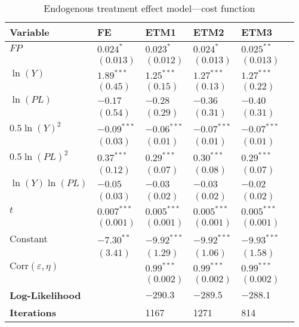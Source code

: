 \begin{table}[ht]
\centering
\caption{Endogenous treatment effect model—cost function}
\label{tab:results}
\begin{tabular}{llllll}
\toprule
\textbf{Variable} & \textbf{FE} & \textbf{ETM1} & \textbf{ETM2} & \textbf{ETM3}\\
\midrule
$FP$ & $0.024^{*}$ & $0.023^{*}$&  $0.024^{*}$ & $0.025^{**}$ \\
          & $(0.013)$ & $(0.012)$ & $(0.013)$ & $(0.013)$ \\[6pt]
$\ln(Y)$ & $1.89^{***}$ & $1.25^{***}$ & $1.27^{***}$ & $1.27^{***}$ \\
           & $(0.45)$ & $(0.15)$ & $(0.13)$ & $(0.22)$ \\[6pt]
$\ln(PL)$ & $-0.17$ & $-0.28$ & $-0.36$ & $-0.40$ \\
           & $(0.54)$ & $(0.29)$ & $(0.31)$& $(0.31)$ \\[6pt]
$0.5 \ln(Y)^2$ & $-0.09^{***}$ & $-0.06^{***}$ & $-0.07^{***}$ & $-0.07^{***}$ \\
           & $(0.03)$ & $(0.01)$ & $(0.01)$ & $(0.01)$ \\[6pt]
$0.5 \ln(PL)^2$ & $0.37^{***}$ & $0.29^{***}$ & $0.30^{***}$ & $0.29^{***}$ \\
           & $(0.12)$ & $(0.07)$ & $(0.08)$ & $(0.07)$ \\[6pt]
$\ln(Y)\ln(PL)$ & $-0.05$ & $-0.03$ & $-0.03$& $-0.02$ \\
           & $(0.03)$ & $(0.02)$& $(0.02)$ & $(0.02)$ \\[6pt]
$t$ & $0.007^{***}$ & $0.005^{***}$ & $0.005^{***}$ & $0.005^{***}$ \\
           & $(0.001)$ & $(0.001)$ & $(0.001)$ & $(0.001)$ \\[6pt]
Constant & $-7.30^{**}$ & $-9.92^{***}$ & $-9.92^{***}$ & $-9.93^{***}$ \\
           & $(3.41)$ & $(1.29)$ & $(1.06)$ & $(1.58)$ \\[6pt]
$\text{Corr}(\varepsilon, \eta)$ &  &  $0.99^{***}$ & $0.99^{***}$ & $0.99^{***}$ \\
           &  & $(0.002)$ & $(0.002)$ & $(0.002)$ \\[6pt]
\midrule
\textbf{Log-Likelihood} &  & $-290.3$ & $-289.5$ & $-288.1$ \\
\textbf{Iterations} & & 1167 & 1271 & 814 \\
\bottomrule
\end{tabular}
\end{table}

